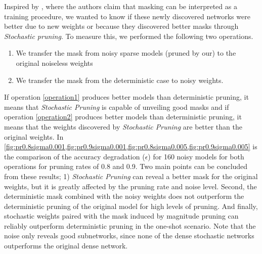 Inspired by \cite{zhouDeconstructingLotteryTickets2019}, where the authors claim that masking can be interpreted as a training procedure, we wanted to know if these newly discovered networks were better due to new weights or because they discovered better masks through \textit{Stochastic pruning}.
To measure this, we performed the following two operations.
\begin{enumerate}[label={\bfseries OP\arabic*}]
    \item We transfer the mask from noisy sparse models (pruned by our) to the original noiseless weights\label{operation1}
    \item We transfer the mask from the deterministic case to noisy weights. \label{operation2}
\end{enumerate}
If operation \ref{operation1} produces better models than deterministic pruning, it means that \textit{Stochastic Pruning} is capable of unveiling good masks and if operation \ref{operation2} produces better models than deterministic pruning, it means that the weights discovered by \textit{Stochastic Pruning}
are better than the original weights. In \cref{fig:pr0.8sigma0.001,fig:pr0.9sigma0.001,fig:pr0.8sigma0.005,fig:pr0.9sigma0.005} is the comparison of the accuracy degradation ($\epsilon$) for 160 noisy models for both operations for pruning rates of 0.8 and 0.9. Two main points can be concluded from these results; 1) \textit{Stochastic Pruning} can reveal a better mask for the original weights, but it is greatly affected by the pruning rate and noise level. 
Second, the deterministic mask combined with the noisy weights does not outperform the deterministic pruning of the original model for high levels of pruning. And finally, stochastic weights paired with the mask induced by magnitude pruning can reliably outperform deterministic pruning in the one-shot scenario. Note that the noise only reveals good subnetworks, since none of the dense stochastic networks outperforms the original dense network.


